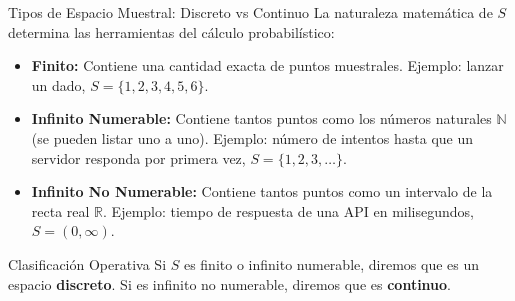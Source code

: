 \begin{frame}{Tipos de Espacio Muestral: Discreto vs Continuo}
  La naturaleza matemática de $S$ determina las herramientas del cálculo probabilístico: \pause

  \vspace{0.4em}
  \begin{itemize}
    \item \textbf{Finito:} Contiene una cantidad exacta de puntos muestrales. Ejemplo: lanzar un dado, $S = \{1, 2, 3, 4, 5, 6\}$. \pause
    \item \textbf{Infinito Numerable:} Contiene tantos puntos como los números naturales $\mathbb{N}$ (se pueden listar uno a uno). Ejemplo: número de intentos hasta que un servidor responda por primera vez, $S = \{1, 2, 3, \dots\}$. \pause
    \item \textbf{Infinito No Numerable:} Contiene tantos puntos como un intervalo de la recta real $\mathbb{R}$. Ejemplo: tiempo de respuesta de una API en milisegundos, $S = (0, \infty)$.
  \end{itemize}

  \vspace{0.4em}
  \pause
  \begin{alertblock}{Clasificación Operativa}
    Si $S$ es finito o infinito numerable, diremos que es un espacio \textbf{discreto}. Si es infinito no numerable, diremos que es \textbf{continuo}.
  \end{alertblock}
\end{frame}

